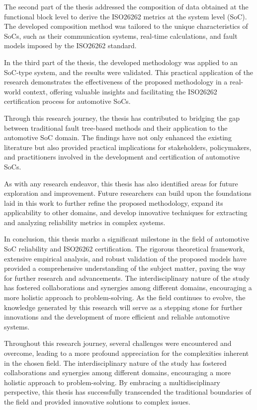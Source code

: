 \documentclass[./dissertation.tex]{subfiles}
\begin{document}
The second part of the thesis addressed the composition of data obtained at the functional block level to derive the ISO26262 metrics at the system level (SoC). The developed composition method was tailored to the unique characteristics of SoCs, such as their communication systems, real-time calculations, and fault models imposed by the ISO26262 standard.

In the third part of the thesis, the developed methodology was applied to an SoC-type system, and the results were validated. This practical application of the research demonstrates the effectiveness of the proposed methodology in a real-world context, offering valuable insights and facilitating the ISO26262 certification process for automotive SoCs.

Through this research journey, the thesis has contributed to bridging the gap between traditional fault tree-based methods and their application to the automotive SoC domain. The findings have not only enhanced the existing literature but also provided practical implications for stakeholders, policymakers, and practitioners involved in the development and certification of automotive SoCs.

As with any research endeavor, this thesis has also identified areas for future exploration and improvement. Future researchers can build upon the foundations laid in this work to further refine the proposed methodology, expand its applicability to other domains, and develop innovative techniques for extracting and analyzing reliability metrics in complex systems.

In conclusion, this thesis marks a significant milestone in the field of automotive SoC reliability and ISO26262 certification. The rigorous theoretical framework, extensive empirical analysis, and robust validation of the proposed models have provided a comprehensive understanding of the subject matter, paving the way for further research and advancements. The interdisciplinary nature of the study has fostered collaborations and synergies among different domains, encouraging a more holistic approach to problem-solving. As the field continues to evolve, the knowledge generated by this research will serve as a stepping stone for further innovations and the development of more efficient and reliable automotive systems.





Throughout this research journey, several challenges were encountered and overcome, leading to a more profound appreciation for the complexities inherent in the chosen field. The interdisciplinary nature of the study has fostered collaborations and synergies among different domains, encouraging a more holistic approach to problem-solving. By embracing a multidisciplinary perspective, this thesis has successfully transcended the traditional boundaries of the field and provided innovative solutions to complex issues.
\end{document}

